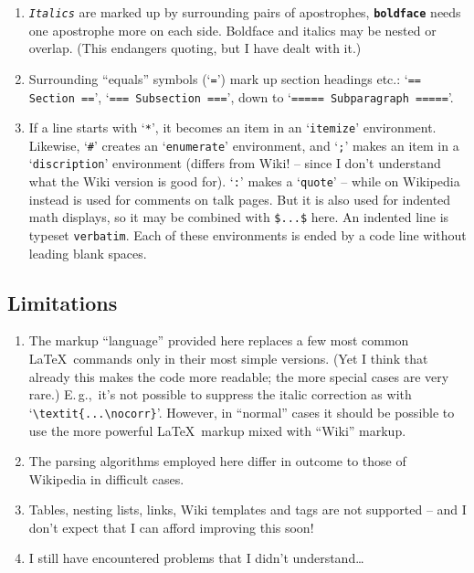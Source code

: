 \documentclass[pagesize=auto]{scrartcl}
\newcommand*{\env}[1]{\texttt{#1}}
\begin{document}
\begin{enumerate}
\item \texttt{\textit{\textquotesingle\textquotesingle Italics\textquotesingle\textquotesingle}} are marked up by surrounding pairs of apostrophes,
  \texttt{\textbf{\textquotesingle\textquotesingle\textquotesingle boldface\textquotesingle\textquotesingle\textquotesingle}} needs one apostrophe more on each side.
  Boldface and italics may be nested or overlap.
  (This endangers quoting, but I have dealt with it.)

\item Surrounding ``equals'' symbols (`\texttt{=}') mark up section headings
  etc.: `\verb+== Section ==+', `\verb+=== Subsection ===+', down to
  `\verb+===== Subparagraph =====+'.

\item If a line starts with `\texttt{*}', it becomes an item in an
  `\env{itemize}' environment. Likewise, `\texttt{\#}' creates an `\env{enumerate}'
  environment, and `\texttt{;}' makes an item in a `\env{discription}'
  environment (differs from Wiki! -- since I don't understand
  what the Wiki version is good for). `\texttt{:}' makes a `\env{quote}' --
  while on Wikipedia instead is used for comments on talk
  pages. But it is also used for indented math displays,
  so it may be combined with \verb+$...$+ here.
  An indented line is typeset \env{verbatim}. Each of these
  environments is ended by a code line without leading blank
  spaces.
\end{enumerate}


\subsection{Limitations}

\begin{enumerate}
\item The markup ``language'' provided here replaces a few most
  common \LaTeX\ commands only in their most simple versions.
  (Yet I think that already this makes the code more readable;
  the more special cases are very rare.) E.\,g.,\ it's not
  possible to suppress the italic correction as with
  `\verb+\textit{...\nocorr}+'. However, in ``normal'' cases it
  should be possible to use the more powerful \LaTeX\ markup
  mixed with ``Wiki'' markup.

\item The parsing algorithms employed here differ in outcome to
  those of Wikipedia in difficult cases.

\item Tables, nesting lists, links, Wiki templates and tags
  are not supported -- and I don't expect that I can afford
  improving this soon!

\item I still have encountered problems that I didn't understand\dots
\end{enumerate}
\end{document}
